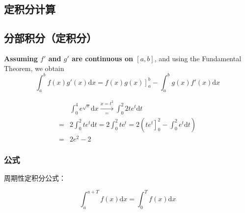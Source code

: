 \subsection{定积分计算}

\subsection{分部积分（定积分）}
\label{definite-integration-by-parts}

\begin{definition}
    \textbf{Assuming $f'$ and $g'$ are continuous on $[a, b]$}, 
    and using the Fundamental Theorem, we obtain
    \[
        \int_a^b f(x) g'(x) \mathrm dx = \left. f(x)g(x) \right]_a^b - \int_a^b g(x)f'(x) \mathrm dx
    \]
\end{definition}

\begin{example}
    \begin{align*}
        &\int_0^4 e^{\sqrt{x}} \mathrm dx \xrightarrow[=]{x = t^2}\int_0^{2} 2t e^{t} \mathrm dt \\ 
        =&2\int_0^2 te^t \mathrm dt = 2 \int_0^2 t \mathrm e^t = 2 
        \left(
            \left.te^t\right]^2_0 - \int_0^2 e^t \mathrm dt
        \right)\\
        =& 2e^2 - 2
    \end{align*} 
\end{example}

\subsubsection{公式}

周期性定积分公式：
\begin{lemma}
    \begin{equation}
        \int_a^{a + T} f(x) \mathrm{d} x = \int_0^T f(x) \mathrm{d} x
    \end{equation}
\end{lemma}

